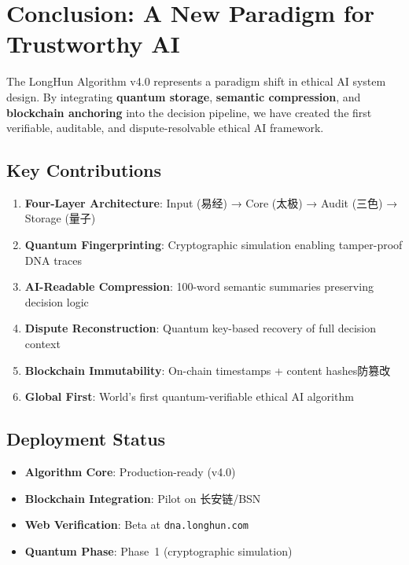 \section{Conclusion: A New Paradigm for Trustworthy AI}
\label{sec:conclusion-v4}

The LongHun Algorithm v4.0 represents a paradigm shift
in ethical AI system design.
By integrating \textbf{quantum storage},
\textbf{semantic compression},
and \textbf{blockchain anchoring}
into the decision pipeline,
we have created the first verifiable,
auditable, and dispute-resolvable ethical AI framework.

\subsection{Key Contributions}

\begin{enumerate}
  \item \textbf{Four-Layer Architecture}:
    Input (易经) → Core (太极) → Audit (三色) → Storage (量子)
  
  \item \textbf{Quantum Fingerprinting}:
    Cryptographic simulation enabling tamper-proof DNA traces
  
  \item \textbf{AI-Readable Compression}:
    100-word semantic summaries preserving decision logic
  
  \item \textbf{Dispute Reconstruction}:
    Quantum key-based recovery of full decision context
  
  \item \textbf{Blockchain Immutability}:
    On-chain timestamps + content hashes防篡改
  
  \item \textbf{Global First}:
    World's first quantum-verifiable ethical AI algorithm
\end{enumerate}

\subsection{Deployment Status}

\begin{itemize}
  \item \textbf{Algorithm Core}: Production-ready (v4.0)
  \item \textbf{Blockchain Integration}: Pilot on 长安链/BSN
  \item \textbf{Web Verification}: Beta at \texttt{dna.longhun.com}
  \item \textbf{Quantum Phase}: Phase~1 (cryptographic simulation)
\end{itemize}


